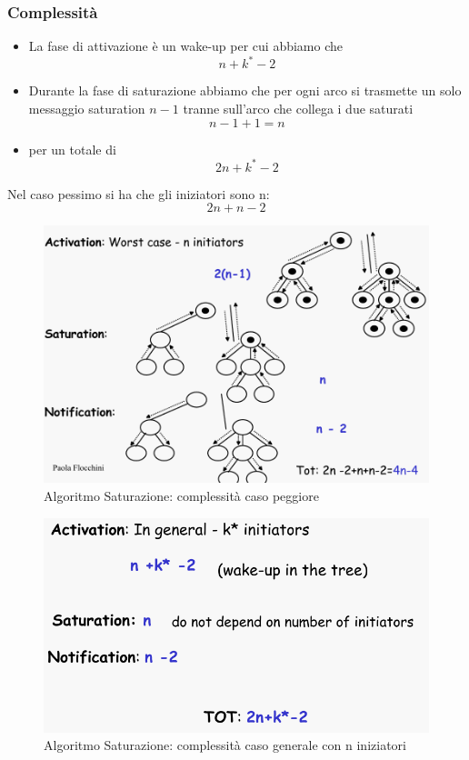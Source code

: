 \documentclass[12pt]{article}
\begin{document}
		\subsubsection{Complessità}
			\begin{itemize}
				\item La fase di attivazione è un wake-up per cui abbiamo che $$n+k^*-2 $$ 
				\item Durante la fase di saturazione abbiamo che per ogni arco si trasmette un solo messaggio saturation $n-1$ tranne sull'arco che collega i due saturati $$n-1+1  = n$$
				\item per un totale di $$2n+k^*-2$$ 
			\end{itemize}
			Nel caso pessimo si ha che gli iniziatori sono n:
			$$2n+n-2 $$
			
			\begin{figure}[h!]
				\centering
				\includegraphics[scale=0.3]{img/satmess.png}
				\caption{Algoritmo Saturazione: complessità caso peggiore}
			\end{figure}
			\begin{figure}[h!]
				\centering
				\includegraphics[scale=0.3]{img/satmess2.png}
				\caption{Algoritmo Saturazione: complessità caso generale con n iniziatori}
			\end{figure}
		
\end{document}
